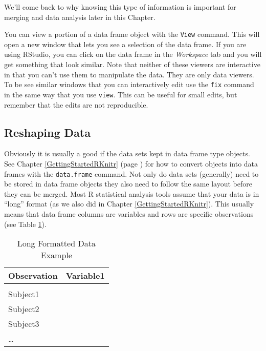 \noindent We'll come back to why knowing this type of information is important for merging and data analysis later in this Chapter.

You can view a portion of a data frame object with the \texttt{View} command. This will open a new window that lets you see a selection of the data frame. If you are using RStudio, you can click on the data frame in the \emph{Workspace} tab and you will get something that look similar. Note that neither of these viewers are interactive in that you can't use them to manipulate the data. They are only data viewers. To be see similar windows that you can interactively edit use the \texttt{fix} command in the same way that you use \texttt{view}. This can be useful for small edits, but remember that the edits are not reproducible.

\subsection{Reshaping Data}

Obviously it is usually a good if the data sets kept in data frame type objects. See Chapter \ref{GettingStartedRKnitr} (page \pageref{data.frame}) for how to convert objects into data frames with the \texttt{data.frame} command. Not only do data sets (generally) need to be stored in data frame objects they also need to follow the same layout before they can be merged. Most R statistical analysis tools assume that your data is in ``long'' format (as we also did in Chapter \ref{GettingStartedRKnitr}). This usually means that data frame columns are variables and rows are specific observations (see Table \ref{ExampleLong}).

\begin{table}[h!]
    \caption{Long Formatted Data Example}
    \label{ExampleLong}
    \begin{tabular}{l c}
        \\[0.15cm]
        \hline
        Observation & Variable1 \\
        \hline \\[0.1cm]
        Subject1 & \\[0.25cm]
        Subject2 & \\[0.25cm]
        Subject3 & \\[0.25cm]
        \ldots & \\[0.25cm]
        \hline
    \end{tabular}
\end{table}

